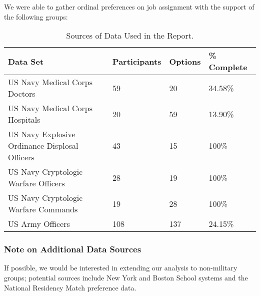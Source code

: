 We were able to gather ordinal preferences on job assignment with the support of the following groups:

\begin{table}[h!]
\begin{center}
\caption{Sources of Data Used in the Report.}
\label{data_table}
\begin{tabular}{l|l|l|l}
\hline 
\textbf{Data Set} & \textbf{Participants} & \textbf{Options} & \textbf{\% Complete} \\
\hline
US Navy Medical Corps Doctors & 59  & 20 & 34.58\%\\
US Navy Medical Corps Hospitals & 20 & 59 & 13.90\%\\
US Navy Explosive Ordinance Displosal Officers & 43 & 15 & 100\%\\
US Navy Cryptologic Warfare Officers & 28 & 19 & 100\%\\
US Navy Cryptologic Warfare Commands & 19 & 28 & 100\%\\
US Army Officers & 108 & 137 & 24.15\%\\
\hline 
\end{tabular}
\end{center}
\end{table}

\subsubsection{Note on Additional Data Sources}

If possible, we would be interested in extending our analysis to non-military groups; potential sources include New York and Boston School systems and the National Residency Match preference data.

